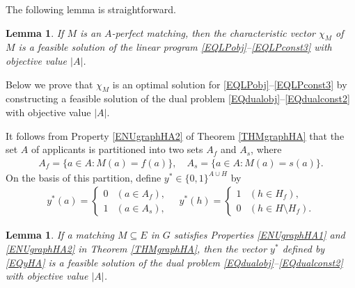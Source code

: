 \documentclass[11pt,a4paper,showkeys]{article}
\theoremstyle{plain}
\newtheorem{lemma}[theorem]{Lemma}
\theoremstyle{definition}
\begin{document}
The following lemma is straightforward. 
\begin{lemma}
\label{LEMprimeHA}
    If $M$ is an $A$-perfect matching, 
    then 
    the characteristic vector $\chi_M$ of $M$ is a feasible solution of the linear program \eqref{EQLPobj}--\eqref{EQLPconst3} with objective value $|A|$. 
\end{lemma}

Below we prove that $\chi_M$ is an optimal solution for \eqref{EQLPobj}--\eqref{EQLPconst3} by 
constructing a feasible solution of the dual problem \eqref{EQdualobj}--\eqref{EQdualconst2} with objective value $|A|$. 

It follows from Property \ref{ENUgraphHA2} of Theorem \ref{THMgraphHA} that 
the set $A$ of applicants is partitioned into two sets $A_f$ and $A_s$, 
where 
\begin{align*}
    A_f= \{ a\in A\colon M(a) = f(a) \}, \quad 
    A_s= \{ a\in A\colon M(a) = s(a) \}. 
\end{align*}
On the basis of this partition, 
define $y^* \in \{0,1\}^{A\cup H}$ by
\begin{align}
    \label{EQyHA}
    y^*(a) = 
    \begin{cases}
        0 & (a\in A_f), \\
        1 & (a\in A_s),
    \end{cases}
    \quad 
    y^*(h) = 
    \begin{cases}
        1 & (h\in H_f), \\
        0 & (h\in H\setminus H_f).
    \end{cases}
\end{align}

\begin{lemma}
\label{LEMdualHA}
    If a matching $M\subseteq E$ in $G$ satisfies Properties \ref{ENUgraphHA1} and \ref{ENUgraphHA2} in Theorem \ref{THMgraphHA}, 
    then the vector $y^*$ defined by \eqref{EQyHA} is a feasible solution of the dual problem \eqref{EQdualobj}--\eqref{EQdualconst2} with objective value $|A|$. 
\end{lemma}
\end{document}
